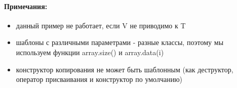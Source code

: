 \paragraph{Примечания:}

\begin{itemize}
\item данный пример не работает, если V не приводимо к T

\item шаблоны с различными параметрами - разные классы, поэтому мы используем функции array.size() и array.data(i)

\item конструктор копирования не может быть шаблонным (как деструктор, оператор присваивания и конструктор по умолчанию)
\end{itemize}